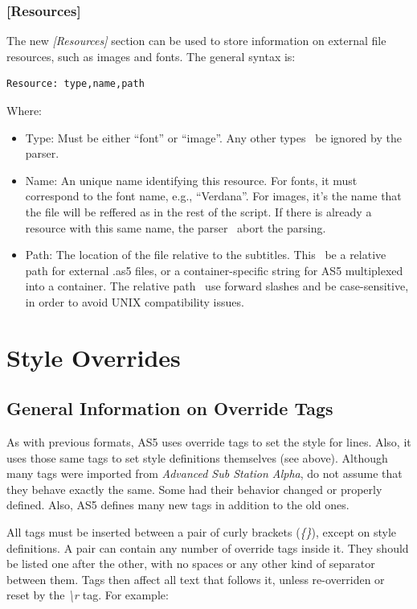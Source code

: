 \documentclass{spec}
\begin{document}
\subsubsection{[Resources]}

The new \emph{[Resources]} section can be used to store information on external file resources,
such as images and fonts. The general syntax is:

\begin{verbatim}
Resource: type,name,path
\end{verbatim}

Where:

\begin{itemize}
\item Type: Must be either ``font'' or ``image''. Any other types \must\ be ignored by the parser.
\item Name: An unique name identifying this resource. For fonts, it must correspond to the font
name, e.g., ``Verdana''. For images, it's the name that the file will be reffered as in the rest
of the script. If there is already a resource with this same name, the parser \must\ abort the
parsing.
\item Path: The location of the file relative to the subtitles. This \must\ be a relative path
for external .as5 files, or a container-specific string for AS5 multiplexed into a container.
The relative path \must\ use forward slashes and be case-sensitive, in order to avoid UNIX
compatibility issues.
\end{itemize}


\newpage
\section{Style Overrides}

\subsection{General Information on Override Tags}
As with previous formats, AS5 uses override tags to set the style for lines. Also, it uses those
same tags to set style definitions themselves (see above). Although many tags were imported from
\emph{Advanced Sub Station Alpha}, do not assume that they behave exactly the same. Some had their
behavior changed or properly defined. Also, AS5 defines many new tags in addition to the old ones.

All tags must be inserted between a pair of curly brackets (\emph{\{\}}), except on style definitions.
A pair can contain any number of override tags inside it. They should be listed one after the other,
with no spaces or any other kind of separator between them. Tags then affect all text that follows
it, unless re-overriden or reset by the \emph{\textbackslash r} tag. For example:
\end{document}

